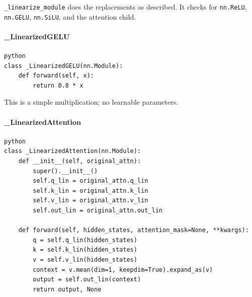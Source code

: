 \texttt{\_linearize\_module} does the replacements as described. It checks for \texttt{nn.ReLU}, \texttt{nn.GELU}, \texttt{nn.SiLU}, and the attention child.

\paragraph{\_LinearizedGELU}

\vspace{0.5em}
\begin{mdframed}[backgroundcolor=codebg, linecolor=codeframe, linewidth=1pt, roundcorner=4pt, innerleftmargin=2pt, innerrightmargin=5pt, innertopmargin=5pt, innerbottommargin=5pt]
\begin{lstlisting}
python
class _LinearizedGELU(nn.Module):
    def forward(self, x):
        return 0.8 * x
\end{lstlisting}
\end{mdframed}
\vspace{0.5em}

This is a simple multiplication; no learnable parameters.

\paragraph{\_LinearizedAttention}

\vspace{0.5em}
\begin{mdframed}[backgroundcolor=codebg, linecolor=codeframe, linewidth=1pt, roundcorner=4pt, innerleftmargin=2pt, innerrightmargin=5pt, innertopmargin=5pt, innerbottommargin=5pt]
\begin{lstlisting}
python
class _LinearizedAttention(nn.Module):
    def __init__(self, original_attn):
        super().__init__()
        self.q_lin = original_attn.q_lin
        self.k_lin = original_attn.k_lin
        self.v_lin = original_attn.v_lin
        self.out_lin = original_attn.out_lin

    def forward(self, hidden_states, attention_mask=None, **kwargs):
        q = self.q_lin(hidden_states)
        k = self.k_lin(hidden_states)
        v = self.v_lin(hidden_states)
        context = v.mean(dim=1, keepdim=True).expand_as(v)
        output = self.out_lin(context)
        return output, None
\end{lstlisting}
\end{mdframed}
\vspace{0.5em}

